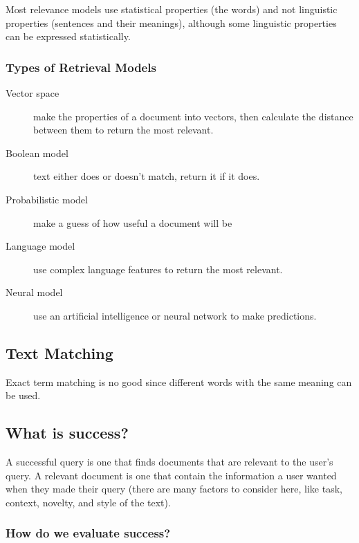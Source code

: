 Most relevance models use statistical properties (the words) and not linguistic properties (sentences and their meanings), although some linguistic properties can be expressed statistically.

\subsubsection{Types of Retrieval Models}\label{ssub:types_of_retrieval_models}

\begin{description}
    \item[Vector space] make the properties of a document into vectors, then calculate the distance between them to return the most relevant.
    \item[Boolean model] text either does or doesn't match, return it if it does.
    \item[Probabilistic model] make a guess of how useful a document will be
    \item[Language model] use complex language features to return the most relevant.
    \item[Neural model] use an artificial intelligence or neural network to make predictions.
\end{description}

\subsection{Text Matching}\label{sub:text_matching}

Exact term matching is no good since different words with the same meaning can be used.

\subsection{What is success?}\label{sub:what_is_success_}

A successful query is one that finds documents that are relevant to the user's query.
A relevant document is one that contain the information a user wanted when they made their query (there are many factors to consider here, like task, context, novelty, and style of the text).

\subsubsection{How do we evaluate success?}\label{ssub:how_do_we_evaluate_success_}

